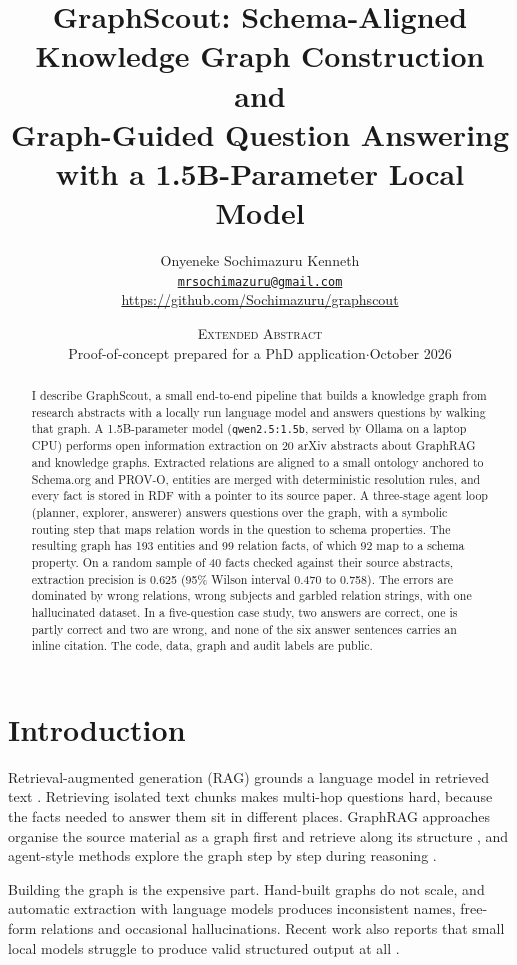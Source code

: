 \documentclass[11pt]{article}
\title{GraphScout: Schema-Aligned Knowledge Graph Construction and\\Graph-Guided Question Answering with a 1.5B-Parameter Local Model}
\author{Onyeneke Sochimazuru Kenneth\\[2pt]
\small\href{mailto:mrsochimazuru@gmail.com}{\texttt{mrsochimazuru@gmail.com}}\\
\small\url{https://github.com/Sochimazuru/graphscout}}
\date{\textsc{Extended Abstract}\\[2pt]\small Proof-of-concept prepared for a PhD application\quad$\cdot$\quad October 2026}
\newcommand{\code}[1]{\texttt{#1}}
\begin{document}
\maketitle

\begin{abstract}
I describe GraphScout, a small end-to-end pipeline that builds a knowledge graph from research abstracts with a locally run language model and answers questions by walking that graph. A 1.5B-parameter model (\code{qwen2.5:1.5b}, served by Ollama on a laptop CPU) performs open information extraction on 20 arXiv abstracts about GraphRAG and knowledge graphs. Extracted relations are aligned to a small ontology anchored to Schema.org and PROV-O, entities are merged with deterministic resolution rules, and every fact is stored in RDF with a pointer to its source paper. A three-stage agent loop (planner, explorer, answerer) answers questions over the graph, with a symbolic routing step that maps relation words in the question to schema properties. The resulting graph has 193 entities and 99 relation facts, of which 92 map to a schema property. On a random sample of 40 facts checked against their source abstracts, extraction precision is 0.625 (95\% Wilson interval 0.470 to 0.758). The errors are dominated by wrong relations, wrong subjects and garbled relation strings, with one hallucinated dataset. In a five-question case study, two answers are correct, one is partly correct and two are wrong, and none of the six answer sentences carries an inline citation. The code, data, graph and audit labels are public.
\end{abstract}

\section{Introduction}

Retrieval-augmented generation (RAG) grounds a language model in retrieved text \cite{lewis2020rag}. Retrieving isolated text chunks makes multi-hop questions hard, because the facts needed to answer them sit in different places. GraphRAG approaches organise the source material as a graph first and retrieve along its structure \cite{edge2024graphrag,han2025ragvsgraphrag}, and agent-style methods explore the graph step by step during reasoning \cite{sun2024tog,thompson2025isgraphrag,gusarov2025multiagent}.

Building the graph is the expensive part. Hand-built graphs do not scale, and automatic extraction with language models produces inconsistent names, free-form relations and occasional hallucinations. Recent work also reports that small local models struggle to produce valid structured output at all \cite{fernandes2026consumer}.
\end{document}
